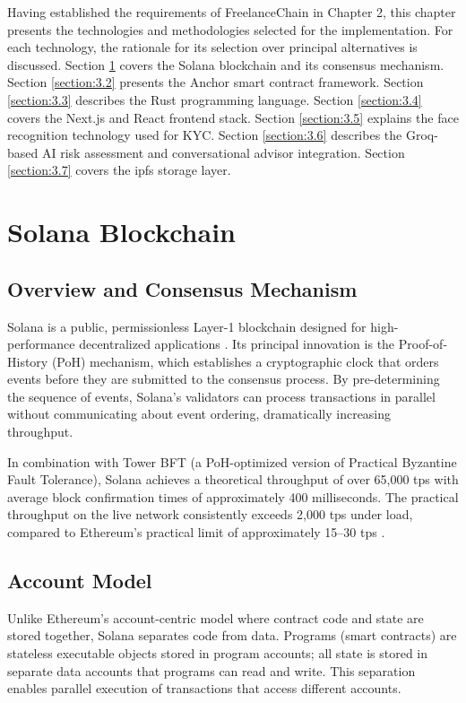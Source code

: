 Having established the requirements of FreelanceChain in Chapter 2, this chapter presents the technologies and methodologies selected for the implementation. For each technology, the rationale for its selection over principal alternatives is discussed. Section \ref{section:3.1} covers the Solana blockchain and its consensus mechanism. Section \ref{section:3.2} presents the Anchor smart contract framework. Section \ref{section:3.3} describes the Rust programming language. Section \ref{section:3.4} covers the Next.js and React frontend stack. Section \ref{section:3.5} explains the face recognition technology used for KYC. Section \ref{section:3.6} describes the Groq-based AI risk assessment and conversational advisor integration. Section \ref{section:3.7} covers the \gls{ipfs} storage layer.

\section{Solana Blockchain}
\label{section:3.1}

\subsection{Overview and Consensus Mechanism}

Solana is a public, permissionless Layer-1 blockchain designed for high-performance decentralized applications \cite{yakovenko2018solana}. Its principal innovation is the Proof-of-History (PoH) mechanism, which establishes a cryptographic clock that orders events before they are submitted to the consensus process. By pre-determining the sequence of events, Solana's validators can process transactions in parallel without communicating about event ordering, dramatically increasing throughput.

In combination with Tower BFT (a PoH-optimized version of Practical Byzantine Fault Tolerance), Solana achieves a theoretical throughput of over 65,000 \gls{tps} with average block confirmation times of approximately 400 milliseconds. The practical throughput on the live network consistently exceeds 2,000 \gls{tps} under load, compared to Ethereum's practical limit of approximately 15--30 \gls{tps} \cite{solana2021performance}.

\subsection{Account Model}

Unlike Ethereum's account-centric model where contract code and state are stored together, Solana separates code from data. Programs (smart contracts) are stateless executable objects stored in program accounts; all state is stored in separate data accounts that programs can read and write. This separation enables parallel execution of transactions that access different accounts.


